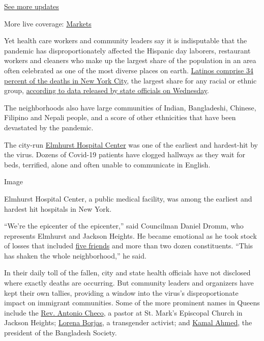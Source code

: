 \href{https://www.nytimes3xbfgragh.onion/2020/08/21/world/covid-19-coronavirus.html?action=click\&pgtype=Article\&state=default\&region=MAIN_CONTENT_1\&context=storylines_live_updates}{See
more updates}

More live coverage:
\href{https://www.nytimes3xbfgragh.onion/live/2020/08/20/business/stock-market-today-coronavirus?action=click\&pgtype=Article\&state=default\&region=MAIN_CONTENT_1\&context=storylines_live_updates}{Markets}

Yet health care workers and community leaders say it is indisputable
that the pandemic has disproportionately affected the Hispanic day
laborers, restaurant workers and cleaners who make up the largest share
of the population in an area often celebrated as one of the most diverse
places on earth.
\href{https://www.nytimes3xbfgragh.onion/2020/04/08/nyregion/coronavirus-race-deaths.html?}{Latinos
comprise 34 percent of the deaths in New York City}, the largest share
for any racial or ethnic group,
\href{https://covid19tracker.health.ny.gov/views/NYS-COVID19-Tracker/NYSDOHCOVID-19Tracker-Fatalities?}{according
to data released by state officials on Wednesday}.

The neighborhoods also have large communities of Indian, Bangladeshi,
Chinese, Filipino and Nepali people, and a score of other ethnicities
that have been devastated by the pandemic.

The city-run
\href{https://www.nytimes3xbfgragh.onion/2020/03/25/nyregion/nyc-coronavirus-hospitals.html}{Elmhurst
Hospital Center} was one of the earliest and hardest-hit by the virus.
Dozens of Covid-19 patients have clogged hallways as they wait for beds,
terrified, alone and often unable to communicate in English.

Image

Elmhurst Hospital Center, a public medical facility, was among the
earliest and hardest hit hospitals in New York.~

``We're the epicenter of the epicenter,'' said Councilman Daniel Dromm,
who represents Elmhurst and Jackson Heights. He became emotional as he
took stock of losses that included
\href{https://twitter.com/Dromm25/status/1245498053890539528?s=20}{five
friends} and more than two dozen constituents. ``This has shaken the
whole neighborhood,'' he said.

In their daily toll of the fallen, city and state health officials have
not disclosed where exactly deaths are occurring. But community leaders
and organizers have kept their own tallies, providing a window into the
virus's disproportionate impact on immigrant communities. Some of the
more prominent names in Queens include the
\href{http://gts.edu/general-news/2020/4/2/in-memoriam-antonio-checo-06}{Rev.
Antonio Checo}, a pastor at St. Mark's Episcopal Church in Jackson
Heights;
\href{https://www.nytimes3xbfgragh.onion/2020/04/01/obituaries/lorena-borjas-dead-coronavirus.html}{Lorena
Borjas}, a transgender activist; and
\href{https://bdnews24.com/people/2020/04/06/kamal-ahmed-chief-of-bangladesh-society-in-new-york-dies-from-coronavirus}{Kamal
Ahmed}, the president of the Bangladesh Society.

